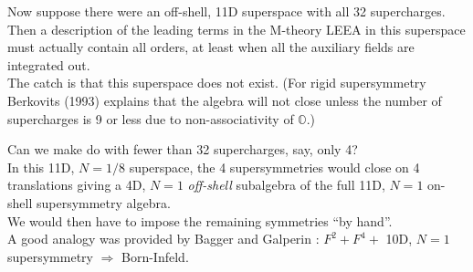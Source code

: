 \documentclass[letter,12pt]{article} %
\begin{document}
Now suppose there were an off-shell, 11D superspace with all 32 supercharges. \\
Then a description of the leading terms in the M-theory LEEA in this superspace must actually contain all orders, at least when all the auxiliary fields are integrated out. \\
The catch is that this superspace does not exist. (For rigid supersymmetry Berkovits (1993) explains that the algebra will not close unless the number of supercharges is 9 or less due to non-associativity of $\mathbb O$.)

Can we make do with fewer than 32 supercharges, say, only 4?\\
In this 11D, $N=1/8$ superspace, the 4 supersymmetries would close on 4 translations giving a 4D, $N=1$ {\em off-shell} subalgebra of the full 11D, $N=1$ on-shell supersymmetry algebra.\\
We would then have to impose the remaining symmetries ``by hand''. \\
A good analogy was provided by Bagger and Galperin \cite{Bagger:1996wp}: $F^2 + F^4 +$ 10D, $N=1$ supersymmetry $\Rightarrow$ Born-Infeld.



\end{document}
